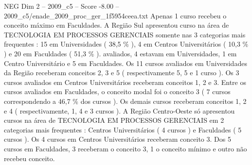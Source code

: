 \begin{textsample}{NEG Dim 2 – 2009\_c5 – Score -8.00 – 2009\_c5/enade\_2009\_proc\_ger\_1f5954ceea.txt}
Apenas 1 curso recebeu o conceito máximo em Faculdades.
A Região Sul apresentou curso na área de TECNOLOGIA EM PROCESSOS GERENCIAIS somente nas 3 categorias mais frequentes : 15 em Universidades ( 38,5 \% ), 4 em Centros Universitários ( 10,3 \% ) e 20 em Faculdades ( 51,3 \% ). avaliados, 4 estavam em Universidades, 1 em Centro Universitário e 5 em Faculdades.
Os 11 cursos avaliados em Universidades da Região receberam conceitos 2, 3 e 5 ( respectivamente 5, 5 e 1 curso ).
Os 3 cursos avaliados em Centros Universitários receberam conceitos 1, 2 e 3.
Entre os cursos avaliados em Faculdades, o conceito modal foi o conceito 3 ( 7 cursos correspondendo a 46,7 \% dos cursos ).
Os demais cursos receberam conceitos 1, 2 e 4 ( respectivamente, 1, 4 e 3 cursos ).
A Região Centro-Oeste só apresentou cursos na área de TECNOLOGIA EM PROCESSOS GERENCIAIS em 2 categorias mais frequentes : Centros Universitários ( 4 cursos ) e Faculdades ( 5 cursos ).
Os 4 cursos em Centros Universitários receberam conceito 3.
Dos 5 cursos em Faculdades, 3 receberam o conceito 3, 1 o conceito mínimo e outro não recebeu conceito.

\end{textsample}

